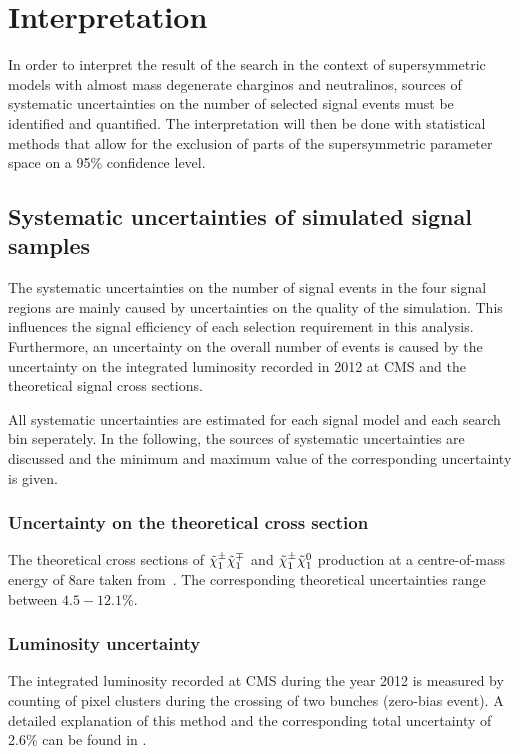 \chapter{Interpretation}
\label{sec:Interpretation}
In order to interpret the result of the search in the context of supersymmetric models with almost mass degenerate charginos and neutralinos, sources of systematic uncertainties on the number of selected signal events must be identified and quantified.
The interpretation will then be done with statistical methods that allow for the exclusion of parts of the supersymmetric parameter space on a 95\% confidence level.

\section{Systematic uncertainties of simulated signal samples}
The systematic uncertainties on the number of signal events in the four signal regions are mainly caused by uncertainties on the quality of the simulation.
This influences the signal efficiency of each selection requirement in this analysis.
Furthermore, an uncertainty on the overall number of events is caused by the uncertainty on the integrated luminosity recorded in 2012 at CMS and the theoretical signal cross sections.

All systematic uncertainties are estimated for each signal model and each search bin seperately.
In the following, the sources of systematic uncertainties are discussed and the minimum and maximum value of the corresponding uncertainty is given.

\subsection*{Uncertainty on the theoretical cross section}
The theoretical cross sections of $\tilde{\chi}^{\pm}_{1}\tilde{\chi}^{\mp}_{1}$ and $\tilde{\chi}^{\pm}_{1}\tilde{\chi}^{0}_{1}$ production at a centre-of-mass energy of 8\tev are taken from~\cite{bib:SignalCrossSection_2012,bib:SignalCrossSection_2013}.
The corresponding theoretical uncertainties range between $4.5-12.1\%$.

\subsection*{Luminosity uncertainty}
The integrated luminosity recorded at CMS during the year 2012 is measured by counting of pixel clusters during the crossing of two bunches (zero-bias event).
A detailed explanation of this method and the corresponding total uncertainty of 2.6\% can be found in \cite{bib:CMS:Lumi_PAS}.

